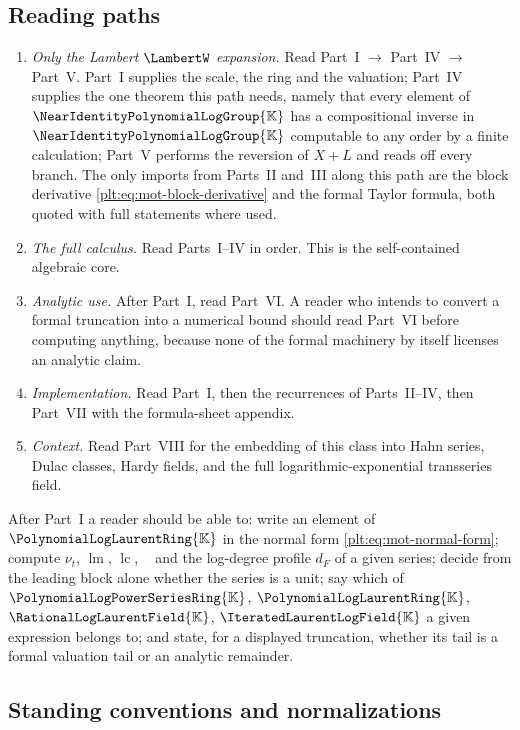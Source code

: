 \documentclass[11pt,oneside]{article}
\theoremstyle{plain}
\theoremstyle{definition}
\theoremstyle{remark}
\newcommand{\K}{\mathbb{K}}
\newcommand{\PLpow}{\PolynomialLogPowerSeriesRing{\K}}   %
\newcommand{\PLlau}{\PolynomialLogLaurentRing{\K}}       %
\newcommand{\PLrat}{\RationalLogLaurentField{\K}}        %
\newcommand{\PLit}{\IteratedLaurentLogField{\K}}         %
\newcommand{\Gnear}{\NearIdentityPolynomialLogGroup{\K}} %
\newcommand{\ordt}{\nu_{t}}                              %
\DeclareMathOperator{\lm}{lm}
\DeclareMathOperator{\lc}{lc}
\DeclareMathOperator{\degL}{deg_{L}}
\newcommand{\dprofile}[1]{d_{#1}}                        %
\begin{document}
\subsection{Reading paths}
\label{plt:sec:mot-paths}

\begin{enumerate}
\item \emph{Only the Lambert \(\LambertW\) expansion.}  Read
  Part~I \(\to\) Part~IV \(\to\) Part~V.  Part~I supplies the scale, the ring
  and the valuation; Part~IV supplies the one theorem this path needs, namely
  that every element of \(\Gnear\) has a compositional inverse in \(\Gnear\)
  computable to any order by a finite calculation; Part~V performs the
  reversion of \(X+L\) and reads off every branch.  The only imports from
  Parts~II and~III along this path are the block derivative
  \eqref{plt:eq:mot-block-derivative} and the formal Taylor formula, both
  quoted with full statements where used.
\item \emph{The full calculus.}  Read Parts~I--IV in order.  This is the
  self-contained algebraic core.
\item \emph{Analytic use.}  After Part~I, read Part~VI.  A reader who intends
  to convert a formal truncation into a numerical bound should read Part~VI
  before computing anything, because none of the formal machinery by itself
  licenses an analytic claim.
\item \emph{Implementation.}  Read Part~I, then the recurrences of
  Parts~II--IV, then Part~VII with the formula-sheet appendix.
\item \emph{Context.}  Read Part~VIII for the embedding of this class into
  Hahn series, Dulac classes, Hardy fields, and the full
  logarithmic-exponential transseries field.
\end{enumerate}

\begin{checkpointbox}
After Part~I a reader should be able to: write an element of \(\PLlau\) in the
normal form \eqref{plt:eq:mot-normal-form}; compute \(\ordt\), \(\lm\),
\(\lc\), \(\degL\) and the log-degree profile \(\dprofile{F}\) of a given
series; decide from the leading block alone whether the series is a unit; say
which of \(\PLpow\), \(\PLlau\), \(\PLrat\), \(\PLit\) a given expression
belongs to; and state, for a displayed truncation, whether its tail is a formal
valuation tail or an analytic remainder.
\end{checkpointbox}

\subsection{Standing conventions and normalizations}
\label{plt:sec:mot-conventions}
\end{document}
